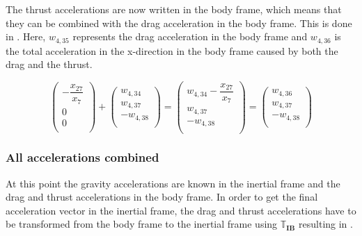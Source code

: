 The thrust accelerations are now written in the body frame, which means that they can be combined with the drag acceleration in the body frame. This is done in . Here, $w_{4,35}$ represents the drag acceleration in the body frame and $w_{4,36}$ is the total acceleration in the x-direction in the body frame caused by both the drag and the thrust.


\begin{equation} \label{eq:DandTBody}
\begin{pmatrix}
-\dfrac{x_{27}}{x_{7}}\\
0\\
0\\
\end{pmatrix}
+
\begin{pmatrix}
w_{4,34}\\
w_{4,37}\\
-w_{4,38}\\
\end{pmatrix}
=
\begin{pmatrix}
w_{4,34}-\dfrac{x_{27}}{x_{7}}\\
w_{4,37}\\
-w_{4,38}\\
\end{pmatrix}
=
\begin{pmatrix}
w_{4,36}\\
w_{4,37}\\
-w_{4,38}\\
\end{pmatrix}
\end{equation}

\subsubsection{All accelerations combined}
\label{subsubsec:allAcc}
At this point the gravity accelerations are known in the inertial frame and the drag and thrust accelerations in the body frame. In order to get the final acceleration vector in the inertial frame, the drag and thrust accelerations have to be transformed from the body frame to the inertial frame using $\mathbb{T}_{\mathbf{IB}}$ resulting in .



